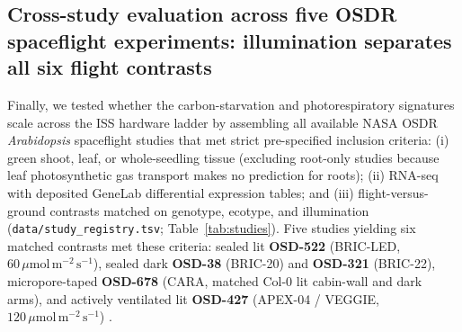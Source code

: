 \documentclass[preprint,11pt,numbers,sort&compress]{elsarticle}
\newcommand{\ums}{\ensuremath{\mu\mathrm{mol\,m^{-2}\,s^{-1}}}}
\begin{document}
\subsection{Cross-study evaluation across five OSDR spaceflight experiments: illumination separates all six flight contrasts}\label{sec:ladder}

Finally, we tested whether the carbon-starvation and photorespiratory signatures scale across the ISS hardware ladder by assembling all available NASA OSDR \textit{Arabidopsis} spaceflight studies that met strict pre-specified inclusion criteria: (i) green shoot, leaf, or whole-seedling tissue (excluding root-only studies because leaf photosynthetic gas transport makes no prediction for roots); (ii) RNA-seq with deposited GeneLab differential expression tables; and (iii) flight-versus-ground contrasts matched on genotype, ecotype, and illumination (\texttt{data/study\_registry.tsv}; Table~\ref{tab:studies}). Five studies yielding six matched contrasts met these criteria: sealed lit \textbf{OSD-522} (BRIC-LED, $60\,\ums$), sealed dark \textbf{OSD-38} (BRIC-20) and \textbf{OSD-321} (BRIC-22), micropore-taped \textbf{OSD-678} (CARA, matched Col-0 lit cabin-wall and dark arms), and actively ventilated lit \textbf{OSD-427} (APEX-04 / VEGGIE, $120\,\ums$) \citep{osd522,osd38,osd321,osd678,osd427}.
\end{document}
